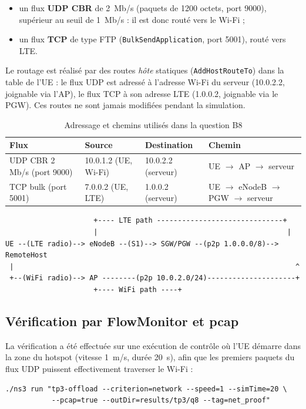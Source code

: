 \begin{itemize}
  \item un flux \textbf{UDP CBR} de 2~Mb/s (paquets de 1200 octets, port 9000),
        supérieur au seuil de 1~Mb/s : il est donc routé vers le Wi-Fi ;
  \item un flux \textbf{TCP} de type FTP (\texttt{BulkSendApplication}, port
        5001), routé vers LTE.
\end{itemize}

Le routage est réalisé par des routes \emph{hôte} statiques
(\texttt{AddHostRouteTo}) dans la table de l'UE : le flux UDP est adressé à
l'adresse Wi-Fi du serveur (10.0.2.2, joignable via l'AP), le flux TCP à son
adresse LTE (1.0.0.2, joignable via le PGW). Ces routes ne sont jamais
modifiées pendant la simulation.

\begin{table}[H]
\centering
\caption{Adressage et chemins utilisés dans la question B8}
\begin{tabular}{llll}
\toprule
Flux & Source & Destination & Chemin \\
\midrule
UDP CBR 2 Mb/s (port 9000) & 10.0.1.2 (UE, Wi-Fi) & 10.0.2.2 (serveur) & UE $\to$ AP $\to$ serveur \\
TCP bulk (port 5001)       & 7.0.0.2 (UE, LTE)    & 1.0.0.2 (serveur) & UE $\to$ eNodeB $\to$ PGW $\to$ serveur \\
\bottomrule
\end{tabular}
\end{table}

\begin{lstlisting}
                     +---- LTE path ------------------------------+
                     |                                             |
UE --(LTE radio)--> eNodeB --(S1)--> SGW/PGW --(p2p 1.0.0.0/8)--> RemoteHost
 |                                                                   ^
 +--(WiFi radio)--> AP --------(p2p 10.0.2.0/24)---------------------+
                     +---- WiFi path ----+
\end{lstlisting}

\subsection{Vérification par FlowMonitor et pcap}
La vérification a été effectuée sur une exécution de contrôle où l'UE démarre
dans la zone du hotspot (vitesse 1~m/s, durée 20~s), afin que les premiers
paquets du flux UDP puissent effectivement traverser le Wi-Fi :
\begin{lstlisting}
./ns3 run "tp3-offload --criterion=network --speed=1 --simTime=20 \
           --pcap=true --outDir=results/tp3/q8 --tag=net_proof"
\end{lstlisting}

